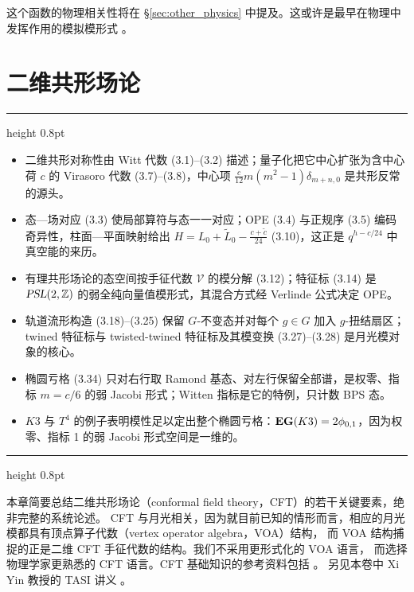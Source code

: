 \documentclass[11pt,a4paper,fontset=windows]{ctexart}
\numberwithin{equation}{section}
\newenvironment{keytakeaways}
  {\par\medskip\noindent
   \begin{minipage}{\linewidth}
   \hrule height 0.8pt\smallskip
   \noindent{\bfseries 本节重点（Key Takeaways）}\par\smallskip
   \begin{itemize}[leftmargin=1.6em,itemsep=2pt,topsep=1pt,parsep=0pt,partopsep=0pt]}
  {\end{itemize}\smallskip\hrule height 0.8pt\end{minipage}%
   \par\medskip}
\newcommand{\PSL}{\operatorname{\textsl{PSL}}}    %
\newcommand{\ZZ}{\mathbb{Z}}
\def\t{\tau}
\begin{document}
\begin{itemize}
{%

这个函数的物理相关性将在 \S\ref{sec:other_physics} 中提及。这或许是最早在物理中发挥作用的模拟模形式 \cite{MR1285785,Vafa:1994tf}。
}
\end{itemize}


\section{二维共形场论}
\label{sec:CFT}

\begin{keytakeaways}
  \item 二维共形对称性由 Witt 代数 (3.1)--(3.2) 描述；量子化把它中心扩张为含中心荷 $c$ 的 Virasoro 代数 (3.7)--(3.8)，中心项 $\frac{c}{12}m(m^2-1)\delta_{m+n,0}$ 是共形反常的源头。
  \item 态—场对应 (3.3) 使局部算符与态一一对应；OPE (3.4) 与正规序 (3.5) 编码奇异性，柱面—平面映射给出 $H=L_0+\tilde L_0-\frac{c+\tilde c}{24}$ (3.10)，这正是 $q^{h-c/24}$ 中真空能的来历。
  \item 有理共形场论的态空间按手征代数 $\mathcal{V}$ 的模分解 (3.12)；特征标 (3.14) 是 $\PSL(2,\ZZ)$ 的弱全纯向量值模形式，其混合方式经 Verlinde 公式决定 OPE。
  \item 轨道流形构造 (3.18)--(3.25) 保留 $G$-不变态并对每个 $g\in G$ 加入 $g$-扭结扇区；twined 特征标与 twisted-twined 特征标及其模变换 (3.27)--(3.28) 是月光模对象的核心。
  \item 椭圆亏格 (3.34) 只对右行取 Ramond 基态、对左行保留全部谱，是权零、指标 $m=c/6$ 的弱 Jacobi 形式；Witten 指标是它的特例，只计数 BPS 态。
  \item $K3$ 与 $T^4$ 的例子表明模性足以定出整个椭圆亏格：${\bf EG}(K3)=2\phi_{0,1}$，因为权零、指标 1 的弱 Jacobi 形式空间是一维的。
\end{keytakeaways}

本章简要总结二维共形场论（conformal field theory，CFT）的若干关键要素，绝非完整的系统论述。
CFT 与月光相关，因为就目前已知的情形而言，相应的月光模都具有顶点算子代数（vertex operator algebra，VOA）结构，
而 VOA 结构捕捉的正是二维 CFT 手征代数的结构。我们不采用更形式化的 VOA 语言，
而选择物理学家更熟悉的 CFT 语言。CFT 基础知识的参考资料包括
\cite{DiFrancescoPhilippe1997Cft/,BlumenhagenRalph2009ItCF,MR2201600,MatthiasRGaberdiel2000Aitc}。
另见本卷中 Xi Yin 教授的 TASI 讲义 \cite{xi_yin_tasi17}。
\end{document}

